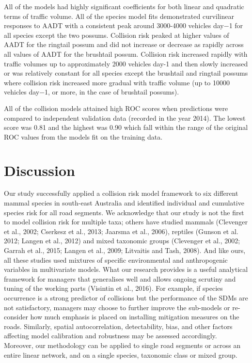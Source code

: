 All of the models had highly significant coefficients for both linear and quadratic terms of traffic volume.  All of the species model fits demonstrated curvilinear responses to AADT with a consistent peak around 3000-4000 vehicles day−1 for all species except the two possums.  Collision risk peaked at higher values of AADT for the ringtail possum and did not increase or decrease as rapidly across all values of AADT for the brushtail possum.  Collision risk increased rapidly with traffic volumes up to approximately 2000 vehicles day-1 and then slowly increased or was relatively constant for all species except the brushtail and ringtail possums where collision risk increased more gradual with traffic volume (up to 10000 vehicles day−1, or more, in the case of brushtail possums).

All of the collision models attained high ROC scores when predictions were compared to independent validation data (recorded in the year 2014).  The lowest score was 0.81 and the highest was 0.90 which fall within the range of the original ROC values from the models fit on the training data.

\section{Discussion}

Our study successfully applied a collision risk model framework to six different mammal species in south-east Australia and identified individual and cumulative species risk for all road segments. We acknowledge that our study is not the first to model collision risk for multiple taxa; others have studied mammals (Clevenger et al., 2002; Cserkesz et al., 2013; Jaarsma et al., 2006), reptiles (Gunson et al. 2012; Langen et al., 2012) and mixed taxonomic groups (Clevenger et al., 2002; Garrah et al., 2015; Langen et al., 2009; Litvaitis and Tash, 2008).  And like ours, all these studies used mixtures of specific environmental and anthropogenic variables in multivariate models. What our research provides is a useful analytical framework for managers that generalises well and allows ongoing scrutiny and tuning of the working parts (Visintin et al., 2016).  For example, if species occurrence is a strong predictor of collisions but the performance of the SDMs are not satisfactory, managers may choose to further improve the sub-models or re-consider how much emphasis is placed on installing mitigation measures on the roads.  Similarly, spatial autocorrelation, detectability, bias, and other factors affecting model calibration and robustness may be assessed accordingly. Moreover, our methodology can be applied to single road segments or across an entire linear network, and on a single species, taxonomic class or mixed group.

